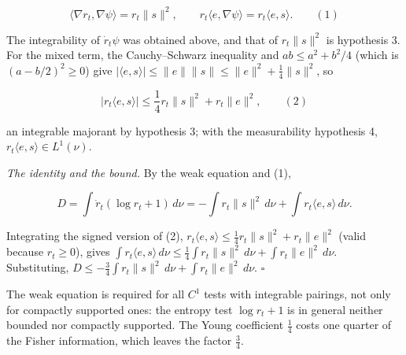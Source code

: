 \documentclass[11pt,a4paper]{article}
\begin{document}
\[\langle\nabla r_t,\nabla\psi\rangle=r_t\|s\|^2,\qquad r_t\langle e,\nabla\psi\rangle=r_t\langle e,s\rangle.\qquad(1)\]


The integrability of \(\dot r_t\psi\) was obtained above, and that of \(r_t\|s\|^2\) is hypothesis 3. For the mixed term, the Cauchy–Schwarz inequality and \(ab\le a^2+b^2/4\) (which is \((a-b/2)^2\ge0\)) give \(|\langle e,s\rangle|\le\|e\|\|s\|\le\|e\|^2+\frac14\|s\|^2\), so


\[\bigl|r_t\langle e,s\rangle\bigr|\le\frac14r_t\|s\|^2+r_t\|e\|^2,\qquad(2)\]


an integrable majorant by hypothesis 3; with the measurability hypothesis 4, \(r_t\langle e,s\rangle\in L^1(\nu)\).




\emph{The identity and the bound.} By the weak equation and (1),


\[D=\int\dot r_t(\log r_t+1)\,d\nu=-\int r_t\|s\|^2\,d\nu+\int r_t\langle e,s\rangle\,d\nu.\]


Integrating the signed version of (2), \(r_t\langle e,s\rangle\le\frac14r_t\|s\|^2+r_t\|e\|^2\) (valid because \(r_t\ge0\)), gives \(\int r_t\langle e,s\rangle\,d\nu\le\frac14\int r_t\|s\|^2\,d\nu+\int r_t\|e\|^2\,d\nu\). Substituting, \(D\le-\frac34\int r_t\|s\|^2\,d\nu+\int r_t\|e\|^2\,d\nu\). \(\square\)




The weak equation is required for all \(C^1\) tests with integrable pairings, not only for compactly supported ones: the entropy test \(\log r_t+1\) is in general neither bounded nor compactly supported. The Young coefficient \(\frac14\) costs one quarter of the Fisher information, which leaves the factor \(\frac34\).
\end{document}
